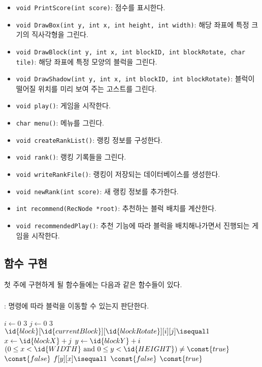 \begin{itemize}
    \item \texttt{void PrintScore(int score)}: 점수를 표시한다.
    \item \texttt{void DrawBox(int y, int x, int height, int width)}: 해당 좌표에 특정 크기의 직사각형을 그린다.
    \item \texttt{void DrawBlock(int y, int x, int blockID, int blockRotate, char tile)}: 해당 좌표에 특정 모양의 블럭을 그린다.
    \item \texttt{void DrawShadow(int y, int x, int blockID, int blockRotate)}: 블럭이 떨어질 위치를 미리 보여 주는 고스트를 그린다.
    \item \texttt{void play()}: 게임을 시작한다.
    \item \texttt{char menu()}: 메뉴를 그린다.
    \item \texttt{void createRankList()}: 랭킹 정보를 구성한다.
    \item \texttt{void rank()}: 랭킹 기록들을 그린다.
    \item \texttt{void writeRankFile()}: 랭킹이 저장되는 데이터베이스를 생성한다.
    \item \texttt{void newRank(int score)}: 새 랭킹 정보를 추가한다.
    \item \texttt{int recommend(RecNode *root)}: 추천하는 블럭 배치를 계산한다.
    \item \texttt{void recommendedPlay()}: 추천 기능에 따라 블럭을 배치해나가면서 진행되는 게임을 시작한다.
\end{itemize}

\newpage

\subsection{함수 구현}
첫 주에 구현하게 될 함수들에는 다음과 같은 함수들이 있다.

\subsubsection{}: 명령에 따라 블럭을 이동할 수 있는지 판단한다.

\begin{codebox}
\li \For $i \gets 0$ \To $3$
\li \Do
        \For $j \gets 0$ \To $3$
\li     \Do
            \If $\id{block}[\id{currentBlock}][\id{blockRotate}][i][j] \isequal 1$
\li         \Then
                $x \gets \id{blockX} + j$
\li             $y \gets \id{blockY} + i$
\li             \If $\left( 0 \leq x < \id{WIDTH} \mbox{ and } 0 \leq y < \id{HEIGHT} \right) \neq \const{true}$
\li                 \Then \Return $\const{false}$
                \End
\li             \If $f[y][x] \isequal 1$
\li                 \Then \Return $\const{false}$
                \End
            \End
        \End
    \End
\li \Return $\const{true}$
\end{codebox}

